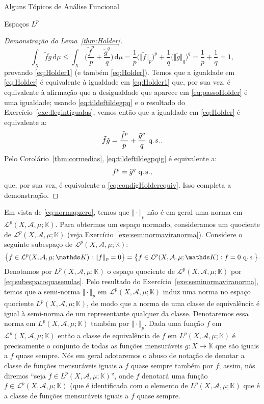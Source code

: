 \documentclass[oneside,final,11pt]{amsbook}
\newcommand{\K}{\mathds K}
\newcommand{\dd}{\mathrm d}
\newcommand{\qs}{\hbox{q.$\,$s.}}
\theoremstyle{remark}\newtheorem{exercise}{Exercício}[chapter]
\theoremstyle{remark}\newtheorem{*exercise}[exercise]{\hbox to 0pt{\hskip 0pt minus 1fil*}Exercício}
\theoremstyle{definition}\newtheorem{exdefin}{Definição}[chapter]
\theoremstyle{plain}\newtheorem{teo}{Teorema}[section]
\theoremstyle{plain}\newtheorem{lem}[teo]{Lema}
\theoremstyle{plain}\newtheorem{prop}[teo]{Proposição}
\theoremstyle{plain}\newtheorem{cor}[teo]{Corolário}
\theoremstyle{definition}\newtheorem{defin}[teo]{Definição}
\theoremstyle{remark}\newtheorem{rem}[teo]{Observação}
\theoremstyle{definition}\newtheorem{notation}[teo]{Notação}
\theoremstyle{definition}\newtheorem{convention}[teo]{Convenção}
\theoremstyle{definition}\newtheorem{example}[teo]{Exemplo}
\numberwithin{section}{chapter}
\numberwithin{equation}{section}
\begin{document}
\begin{chapter}{Alguns Tópicos de Análise Funcional}
\begin{section}[Espaços $L^p$]{Espaços ${L^p}$}
\begin{proof}[Demonstração do Lema~\ref{thm:Holder}]
\begin{equation}\label{eq:passoHolder}
\int_X\tilde f\tilde g\,\dd\mu\le\int_X\Big(\frac{\tilde f^p}p+\frac{\tilde g^q}q\Big)\,\dd\mu=
\frac1p\big(\Vert\tilde f\Vert_p\big)^p+\frac1q\big(\Vert\tilde g\Vert_q\big)^q
=\frac1p+\frac1q=1,
\end{equation}
provando \eqref{eq:Holder1} (e também \eqref{eq:Holder}). Temos que a igualdade em \eqref{eq:Holder} é equivalente
à igualdade em \eqref{eq:Holder1} que, por sua vez, é equivalente à afirmação que a desigualdade que aparece em
\eqref{eq:passoHolder} é uma igualdade; usando \eqref{eq:tildeftildegpq} e o resultado do Exercício~\ref{exe:flegintigualqs},
vemos então que a igualdade em \eqref{eq:Holder} é equivalente a:
\begin{equation}\label{eq:tildeftildegpqig}
\tilde f\tilde g=\frac{\tilde f^p}p+\frac{\tilde g^q}q\ \qs.
\end{equation}
Pelo Corolário~\ref{thm:cormedias}, \eqref{eq:tildeftildegpqig} é equivalente a:
\[\tilde f^p=\tilde g^q\ \qs,\]
que, por sua vez, é equivalente a \eqref{eq:condigHolderequiv}. Isso completa a demonstração.
\end{proof}

Em vista de \eqref{eq:normapzero}, temos que $\Vert\cdot\Vert_p$ não é em geral uma norma em $\mathcal L^p(X,\mathcal A,\mu;\K)$.
Para obtermos um espaço normado, consideramos um quociente de $\mathcal L^p(X,\mathcal A,\mu;\K)$ (veja
Exercício~\ref{exe:seminormaviranorma}). Considere o seguinte subespaço de $\mathcal L^p(X,\mathcal A,\mu;\K)$:
\begin{equation}\label{eq:subespacoquasenulas}
\big\{f\in\mathcal L^p(X,\mathcal A,\mu;\K):\Vert f\Vert_p=0\big\}=\big\{f\in\mathcal L^p(X,\mathcal A,\mu;\K):f=0\ \qs\big\}.
\end{equation}
Denotamos por $L^p(X,\mathcal A,\mu;\K)$ o espaço quociente de $\mathcal L^p(X,\mathcal A,\mu;\K)$
por \eqref{eq:subespacoquasenulas}. Pelo resultado do Exercício~\ref{exe:seminormaviranorma}, temos que a semi-norma $\Vert\cdot\Vert_p$
em $\mathcal L^p(X,\mathcal A,\mu;\K)$ induz uma norma no espaço quociente $L^p(X,\mathcal A,\mu;\K)$, de modo que a norma
de uma classe de equivalência é igual à semi-norma de um representante qualquer da classe.
Denotaremos essa norma em $L^p(X,\mathcal A,\mu;\K)$ também por $\Vert\cdot\Vert_p$. Dada uma função
$f$ em $\mathcal L^p(X,\mathcal A,\mu;\K)$ então a classe de equivalência de $f$ em $L^p(X,\mathcal A,\mu;\K)$
é precisamente o conjunto de todas as funções mensuráveis $g:X\to\K$ que são iguais a $f$ quase sempre. Nós
em geral adotaremos o abuso de notação de denotar a classe de funções mensuráveis iguais a $f$ quase sempre também por $f$;
assim, nós diremos ``seja $f\in L^p(X,\mathcal A,\mu;\K)$'', onde $f$ denotará uma função $f\in\mathcal L^p(X,\mathcal A,\mu;\K)$
(que é identificada com o elemento de $L^p(X,\mathcal A,\mu;\K)$ que é a classe de funções mensuráveis iguais a $f$
quase sempre.


\end{section}
\end{chapter}
\end{document}
